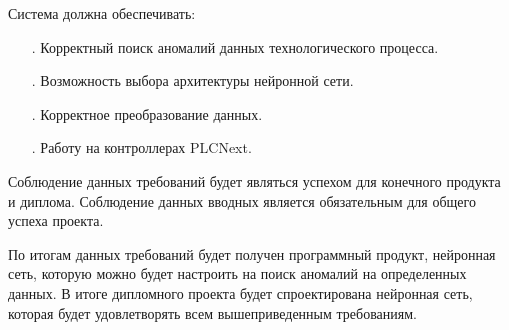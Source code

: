 {\begin{itemize}[leftmargin=2.15cm, labelwidth=0.65cm, labelsep=0.0cm]
		\setcounter{itemcntr}{1}
	\end{itemize} 	

	\par \redline Система должна обеспечивать:
	
	\begin{itemize}[leftmargin=2.15cm, labelwidth=0.65cm, labelsep=0.0cm] 
		\item[\theitemcntr. ] Корректный поиск аномалий данных технологического процесса.
		\addtocounter{itemcntr}{1}
		
		\item[\theitemcntr. ] Возможность выбора архитектуры нейронной сети.		
		\addtocounter{itemcntr}{1}
		
		\item[\theitemcntr. ] Корректное преобразование данных.		
		\addtocounter{itemcntr}{1}
		
		\item[\theitemcntr. ] Работу на контроллерах PLCNext. 		
		\addtocounter{itemcntr}{1}
		
		\setcounter{itemcntr}{1}
	\end{itemize} 	
	
	\par \redline Соблюдение данных требований будет являться успехом для конечного продукта и диплома. Соблюдение данных вводных является обязательным для общего успеха проекта. 
	
	\par \redline По итогам данных требований будет получен программный продукт, нейронная сеть, которую можно будет настроить на поиск аномалий на определенных данных. В итоге дипломного проекта будет спроектирована нейронная сеть, которая будет удовлетворять всем вышеприведенным требованиям.
	
	\par 
}

%



\setcounter{subchaptercntr}{1}
\setcounter{formulacntr}{1}
\setcounter{imagecntr}{1}
\setcounter{tablecntr}{1}


